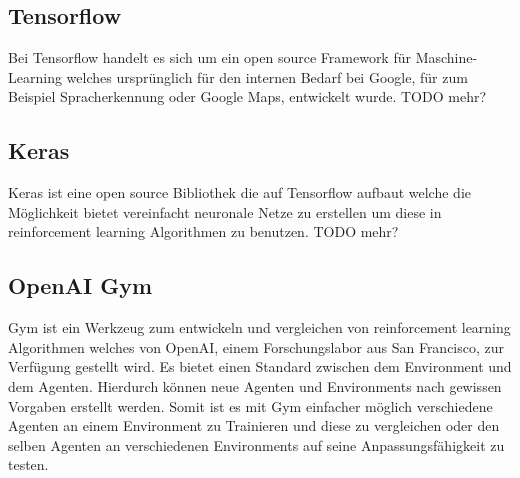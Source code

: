 \subsection{Tensorflow}
Bei Tensorflow handelt es sich um ein open source Framework für Maschine-Learning welches ursprünglich für den internen Bedarf bei Google, für zum Beispiel Spracherkennung oder Google Maps, entwickelt wurde. 
\colorbox{red!30}{TODO mehr?}

\subsection{Keras}
Keras ist eine open source Bibliothek die auf Tensorflow aufbaut welche die Möglichkeit bietet vereinfacht neuronale Netze zu erstellen um diese in reinforcement learning Algorithmen zu benutzen.
\colorbox{red!30}{TODO mehr?}

\subsection{OpenAI Gym}
Gym ist ein Werkzeug zum entwickeln und vergleichen von reinforcement learning Algorithmen welches von OpenAI, einem Forschungslabor aus San Francisco, zur Verfügung gestellt wird. Es bietet einen Standard zwischen dem Environment und dem Agenten. Hierdurch können neue Agenten und Environments nach gewissen Vorgaben erstellt werden. Somit ist es mit Gym einfacher möglich verschiedene Agenten an einem Environment zu Trainieren und diese zu vergleichen oder den selben Agenten an verschiedenen Environments auf seine Anpassungsfähigkeit zu testen.

